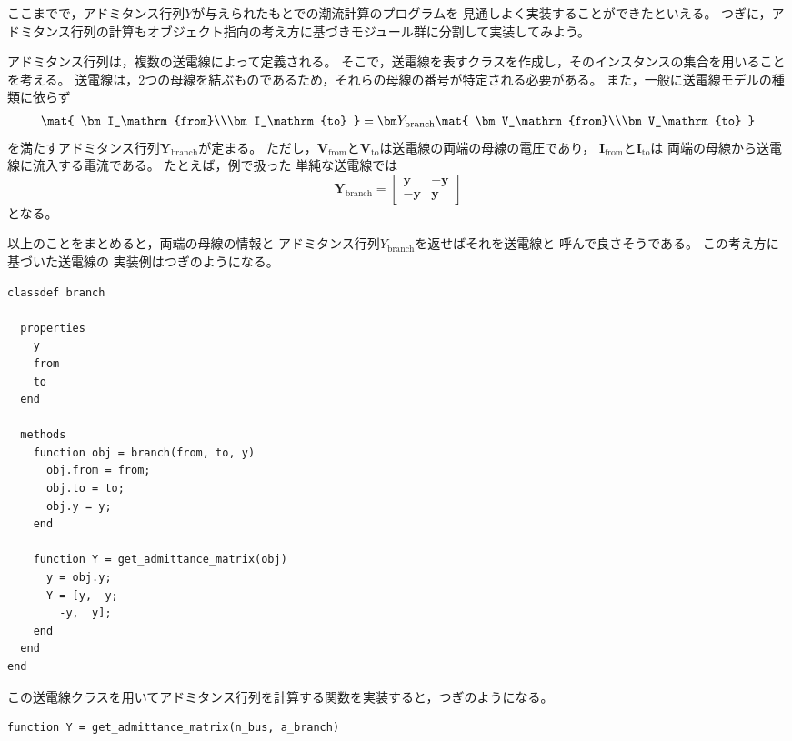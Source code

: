 \documentclass[tombow,dvipdfmx]{corona-a5-1.1}
\begin{document}
ここまでで，アドミタンス行列$Y$が与えられたもとでの潮流計算のプログラムを
見通しよく実装することができたといえる。
つぎに，アドミタンス行列の計算もオブジェクト指向の考え方に基づきモジュール群に分割して実装してみよう。
\begin{例}[オブジェクト指向によるアドミタンス行列の計算]
アドミタンス行列は，複数の送電線によって定義される。
そこで，送電線を表すクラスを作成し，そのインスタンスの集合を用いることを考える。
送電線は，2つの母線を結ぶものであるため，それらの母線の番号が特定される必要がある。
また，一般に送電線モデルの種類に依らず
\begin{align}
\mat{
\bm I_\mathrm{from}\\\bm I_\mathrm{to}
} =
\bm Y_\mathrm{branch}
\mat{
\bm V_\mathrm{from}\\\bm V_\mathrm{to}
}
\end{align}
を満たすアドミタンス行列$\bm Y_\mathrm{branch}$が定まる。
ただし，$\bm V_\mathrm{from}$と$\bm V_\mathrm{to}$は送電線の両端の母線の電圧であり，
$\bm I_\mathrm{from}$と$\bm I_\mathrm{to}$は
両端の母線から送電線に流入する電流である。
たとえば，例\label{ex:derY}で扱った
単純な送電線では
\[
\bm Y_\mathrm{branch} = \begin{bmatrix}
\bm y & -\bm y\\
-\bm y & \bm y
\end{bmatrix}
\]
となる。

以上のことをまとめると，両端の母線の情報と
アドミタンス行列$Y_\mathrm{branch}$を返せばそれを送電線と
呼んで良さそうである。
この考え方に基づいた送電線の
実装例はつぎのようになる。
\smallskip
\begin{PROGRAMA}[count,title={branch.m}]\label{program:branch}
\begin{verbatim}
classdef branch
  
  properties
    y
    from
    to
  end
  
  methods
    function obj = branch(from, to, y)
      obj.from = from;
      obj.to = to;
      obj.y = y;
    end
    
    function Y = get_admittance_matrix(obj)
      y = obj.y;
      Y = [y, -y;
        -y,  y];
    end
  end
end
\end{verbatim}\end{PROGRAMA}

この送電線クラスを用いてアドミタンス行列を計算する関数を実装すると，つぎのようになる。
\smallskip
\begin{PROGRAMA}[count,title={get\_admittance\_matrix.m}]\label{program:admittance}
\begin{verbatim}
function Y = get_admittance_matrix(n_bus, a_branch)


\end{verbatim}
\end{PROGRAMA}
\end{例}
\end{document}
